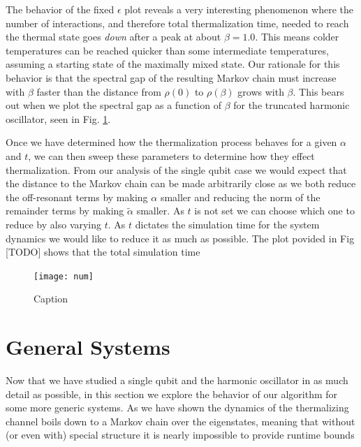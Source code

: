 \documentclass{article}
\begin{document}
The behavior of the fixed $\epsilon$ plot reveals a very interesting phenomenon where the number of interactions, and therefore total thermalization time, needed to reach the thermal state goes \emph{down} after a peak at about $\beta = 1.0$. This means colder temperatures can be reached quicker than some intermediate temperatures, assuming a starting state of the maximally mixed state. Our rationale for this behavior is that the spectral gap of the resulting Markov chain must increase with $\beta$ faster than the distance from $\rho(0)$ to $\rho(\beta)$ grows with $\beta$. This bears out when we plot the spectral gap as a function of $\beta$ for the truncated harmonic oscillator, seen in Fig. \ref{fig:enter-label}.

Once we have determined how the thermalization process behaves for a given $\alpha$ and $t$, we can then sweep these parameters to determine how they effect thermalization. From our analysis of the single qubit case we would expect that the distance to the Markov chain can be made arbitrarily close as we both reduce the off-resonant terms by making $\alpha$ smaller and reducing the norm of the remainder terms by making $\widetilde{\alpha}$ smaller. As $t$ is not set we can choose which one to reduce by also varying $t$. As $t$ dictates the simulation time for the system dynamics we would like to reduce it as much as possible. The plot povided in Fig [TODO] shows that the total simulation time 

\begin{figure}
    \centering
    \texttt{[image: num]}
    \caption{Caption}
    \label{fig:enter-label}
\end{figure}

\section{General Systems}
 Now that we have studied a single qubit and the harmonic oscillator in as much detail as possible, in this section we explore the behavior of our algorithm for some more generic systems. As we have shown the dynamics of the thermalizing channel boils down to a Markov chain over the eigenstates, meaning that without (or even with) special structure it is nearly impossible to provide runtime bounds 
\end{document}
